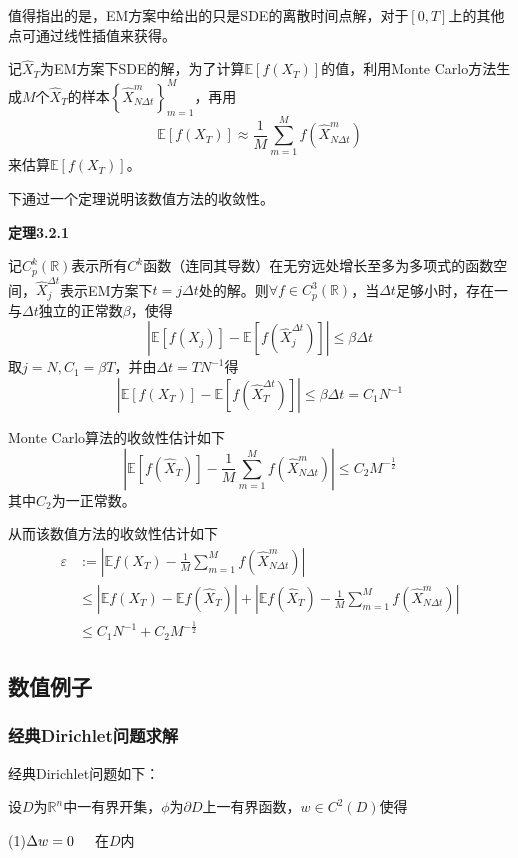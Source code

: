 \documentclass[UTF8，12pt]{ctexart}
\numberwithin{equation}{section}
\begin{document}
值得指出的是，EM方案中给出的只是SDE的离散时间点解，对于$[0,T]$上的其他点可通过线性插值来获得。

记$\hat{X}_T$为EM方案下SDE的解，为了计算$\mathbb{E}[f(X_T)]$的值，利用Monte Carlo方法生成$M$个$\hat{X}_T$的样本$\left\{\widehat{X}_{N\Delta t}^m\right\}_{m=1}^M$，再用
\[
\mathbb{E}[f(X_T)]\approx\frac{1}{M}\sum_{m=1}^{M}f(\widehat{X}_{N\Delta t}^m)
\]
来估算$\mathbb{E}[f(X_T)]$。

下通过一个定理说明该数值方法的收敛性。

\vspace{0.3cm}
\noindent \textbf{定理3.2.1}

记$C_p^k(\mathbb{R})$表示所有$C^k$函数（连同其导数）在无穷远处增长至多为多项式的函数空间，$\widehat{X}_j^{\Delta t}$表示EM方案下$t=j\Delta t$处的解。则$\forall f\in C_p^3(\mathbb{R})$，当$\Delta t$足够小时，存在一与$\Delta t$独立的正常数$\beta$，使得
\[
\left|\mathbb{E}[f(X_j)]-\mathbb{E}[f(\widehat{X}_j^{\Delta t})]\right|\le \beta\Delta t
\]
取$j=N,C_1=\beta T$，并由$\Delta t=TN^{-1}$得
\[
\left|\mathbb{E}[f(X_T)]-\mathbb{E}[f(\widehat{X}_T^{\Delta t})]\right|\le \beta\Delta t=C_1N^{-1}
\]

Monte Carlo算法的收敛性估计如下
\[
\left|\mathbb{E}[f(\widehat{X}_T)]-\frac{1}{M}\sum_{m=1}^{M}f(\widehat{X}_{N\Delta t}^m)\right|\le C_2M^{-\frac{1}{2}}
\]
其中$C_2$为一正常数。

从而该数值方法的收敛性估计如下
\begin{align}
	\varepsilon &:= \left|\mathbb{E}f(X_T)-\frac{1}{M}\sum_{m=1}^{M}f(\widehat{X}_{N\Delta t}^m)\right| \\
	&\le \left|\mathbb{E}f(X_T)-\mathbb{E}f(\widehat{X}_T)\right|+\left|\mathbb{E}f(\widehat{X}_T)-\frac{1}{M}\sum_{m=1}^{M}f(\widehat{X}_{N\Delta t}^m)\right| \\
	&\le C_1N^{-1}+C_2M^{-\frac{1}{2}}
\end{align}
\subsection{数值例子}
\subsubsection{经典Dirichlet问题求解}

经典Dirichlet问题如下：

设$D$为$\mathbb{R}^n$中一有界开集，$\phi$为$\partial D$上一有界函数，$w\in C^2(D)$使得

\noindent(1)$\Delta w=0\hspace{0.5cm}$在$D$内
\end{document}
